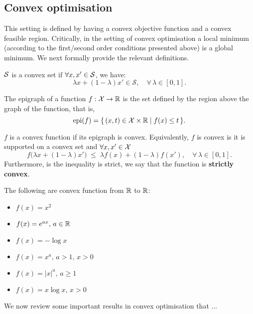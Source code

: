 \subsection{Convex optimisation}
\label{subsec:convex_opt}


This setting is defined by having a convex objective function and a convex feasible region. Critically, in the setting of convex optimisation a local minimum (according to the first/second order conditions presented above) is a global minimum. We next formally provide the relevant definitions.

\begin{definition} ${\mathcal S}$ is a convex set if $\forall x,x'\in{\mathcal S}$, we have:
\begin{equation}
	\lambda x + (1 - \lambda)x' \in \mathcal{S},
	\quad \forall\, \lambda \in [0, 1].
\end{equation}
\end{definition}



\begin{definition} The epigraph of a function $f:{\mathcal X}\to\mathbb{R}$ is the set defined by the region above the graph of the function, that is, 
\begin{equation}
	\operatorname{epi}(f) = \{\, (x, t) \in {\mathcal X} \times \mathbb{R} \mid f(x) \le t \,\}.
\end{equation}


\begin{definition} $f$ is a convex function if its epigraph is convex. Equivalently, $f$ is convex is it is supported on a convex set and $\forall x,x'\in{\mathcal X}$
\begin{equation}
	f\bigl(\lambda x + (1 - \lambda)x'\bigr)
	\;\leq\;
	\lambda f(x) + (1 - \lambda) f(x'),
	\quad \forall\, \lambda \in [0, 1].
\end{equation}
Furthermore, is the inequality is strict, we say that the function is \textbf{strictly convex}.
\end{definition}

\end{definition}


\begin{mdframed}[style=ejemplo, frametitle={\center Example: Convex functions (in 1D)}]

The following are convex function from $\mathbb{R}$ to $\mathbb{R}$:

\begin{itemize}
	\item $f(x) = x^2$
	\item $f(x) = e^{ax},\, a\in\mathbb{R}$
	\item $f(x) = -\log x$
	\item $f(x) = x^a,\, a>1,\, x>0$
	\item $f(x) = |x|^a,\, a\geq 1$
	\item $f(x) = x\log x,\, x>0$
\end{itemize}

\end{mdframed}


We now review some important results in convex optimisation that ...







